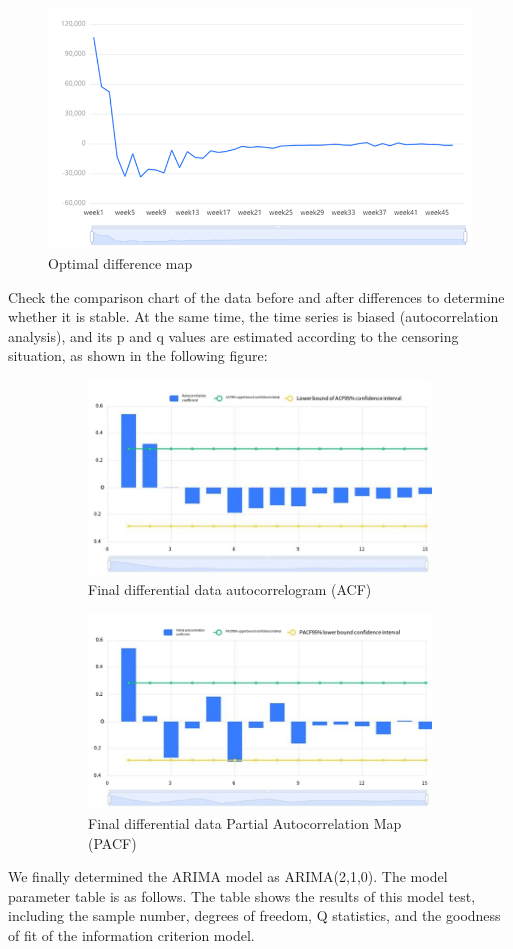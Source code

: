 \documentclass[12pt]{article}  %
\begin{document}
\begin{figure}[htbp]
\centering
\includegraphics[width=.5\textwidth]{img/difference.png}
\caption{Optimal difference map}\label{fig:result}
\end{figure}

Check the comparison chart of the data before and after differences to determine whether it is stable. At the same time, the time series is biased (autocorrelation analysis), and its p and q values are estimated according to the censoring situation, as shown in the following figure:

\begin{figure}[htbp]
\centering
\begin{subfigure}{.4\textwidth}
\includegraphics[width=\textwidth]{img/ACF.png}
\caption{Final differential data autocorrelogram (ACF)}
\end{subfigure}
\begin{subfigure}{.4\textwidth}
\includegraphics[width=\textwidth]{img/PCAF.png}
\caption{Final differential data Partial Autocorrelation Map (PACF)}
\end{subfigure}
\caption{}
\end{figure}
We finally determined the ARIMA model as ARIMA(2,1,0). The model parameter table is as follows. The table shows the results of this model test, including the sample number, degrees of freedom, Q statistics, and the goodness of fit of the information criterion model.
\end{document}
